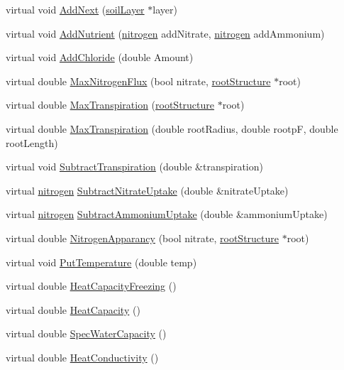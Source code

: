 \begin{DoxyCompactItemize}
virtual void \hyperlink{classsoil_layer_a09f4c3dc099147645d71480166261191}{AddNext} (\hyperlink{classsoil_layer}{soilLayer} $\ast$layer)
\item 
virtual void \hyperlink{classsoil_layer_a1cdb99656097b11d7b7acb329dd6cd5e}{AddNutrient} (\hyperlink{classnitrogen}{nitrogen} addNitrate, \hyperlink{classnitrogen}{nitrogen} addAmmonium)
\item 
virtual void \hyperlink{classsoil_layer_a2de59a5e3a929455c8570915e8297e3b}{AddChloride} (double Amount)
\item 
virtual double \hyperlink{classsoil_layer_a8d2a6031dcc56ae0c290a9503c192963}{MaxNitrogenFlux} (bool nitrate, \hyperlink{structroot_structure}{rootStructure} $\ast$root)
\item 
virtual double \hyperlink{classsoil_layer_aaa3df5650bfb89fe57e853d34680b887}{MaxTranspiration} (\hyperlink{structroot_structure}{rootStructure} $\ast$root)
\item 
virtual double \hyperlink{classsoil_layer_acb4fdc1a1144da5577b222285bf4f161}{MaxTranspiration} (double rootRadius, double rootpF, double rootLength)
\item 
virtual void \hyperlink{classsoil_layer_afed3ac753d46a4ed2ea2b1f3e160752b}{SubtractTranspiration} (double \&transpiration)
\item 
virtual \hyperlink{classnitrogen}{nitrogen} \hyperlink{classsoil_layer_aa7189120b1afb35795a040acd399b179}{SubtractNitrateUptake} (double \&nitrateUptake)
\item 
virtual \hyperlink{classnitrogen}{nitrogen} \hyperlink{classsoil_layer_a88b301de01a73797ff3c48b11d1eef58}{SubtractAmmoniumUptake} (double \&ammoniumUptake)
\item 
virtual double \hyperlink{classsoil_layer_a02f95c5adb418377eef715b4c8d50eef}{NitrogenApparancy} (bool nitrate, \hyperlink{structroot_structure}{rootStructure} $\ast$root)
\item 
virtual void \hyperlink{classsoil_layer_a6b3b3438c29df1bf4037d00875b676e7}{PutTemperature} (double temp)
\item 
virtual double \hyperlink{classsoil_layer_aea32d315c53d868d637078ca9a3c5cd9}{HeatCapacityFreezing} ()
\item 
virtual double \hyperlink{classsoil_layer_a0f90f88d0dfdd44b5075f2e20cec6f45}{HeatCapacity} ()
\item 
virtual double \hyperlink{classsoil_layer_a670e17930818ea08c5ace53a25700f4a}{SpecWaterCapacity} ()
\item 
virtual double \hyperlink{classsoil_layer_a68f3bd7b3e269ba3592e6fd5f04ba9e3}{HeatConductivity} ()

\end{DoxyCompactItemize}
